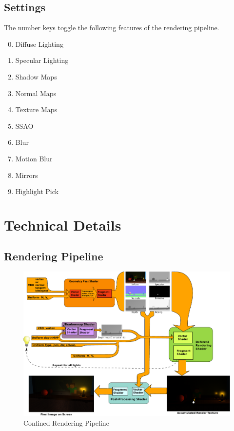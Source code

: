 \documentclass[oneside]{book}
\begin{document}
  \section{Settings}\label{settings}
    The number keys toggle the following features of the rendering pipeline.
    \begin{enumerate}
      \setcounter{enumi}{-1}
      \item Diffuse Lighting
      \item Specular Lighting
      \item Shadow Maps
      \item Normal Maps
      \item Texture Maps
      \item SSAO
      \item Blur
      \item Motion Blur
      \item Mirrors
      \item Highlight Pick
    \end{enumerate}

\chapter{Technical Details}
  \section{Rendering Pipeline} \label{deferred-rendering}
    \begin{figure}[h!]
      \caption{Confined Rendering Pipeline}
      \centering
      \includegraphics[width=1.0\textwidth]{rendering_pipeline}
    \end{figure}
\end{document}
